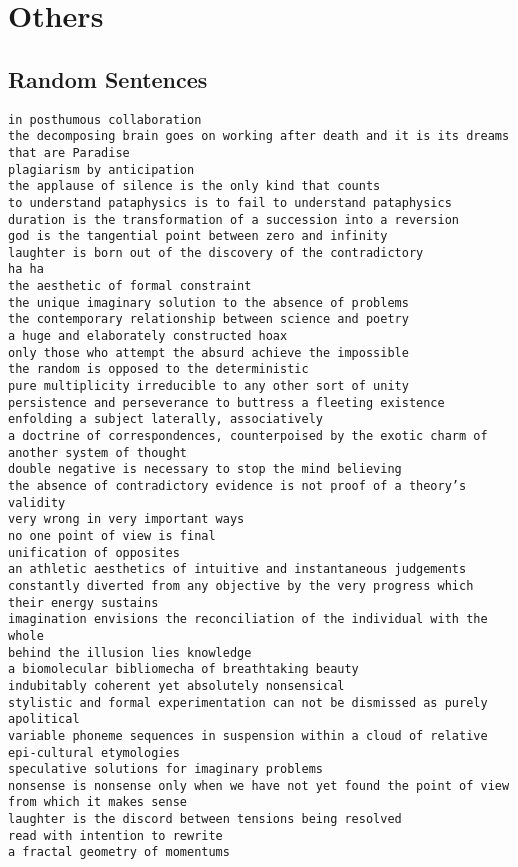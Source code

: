 
\chapter{Others}
\label{app:others}


\section{Random Sentences}
\label{s:appsentences}

\begin{verbatim}
in posthumous collaboration
the decomposing brain goes on working after death and it is its dreams that are Paradise
plagiarism by anticipation
the applause of silence is the only kind that counts
to understand pataphysics is to fail to understand pataphysics
duration is the transformation of a succession into a reversion
god is the tangential point between zero and infinity
laughter is born out of the discovery of the contradictory
ha ha
the aesthetic of formal constraint
the unique imaginary solution to the absence of problems
the contemporary relationship between science and poetry
a huge and elaborately constructed hoax
only those who attempt the absurd achieve the impossible
the random is opposed to the deterministic
pure multiplicity irreducible to any other sort of unity
persistence and perseverance to buttress a fleeting existence
enfolding a subject laterally, associatively
a doctrine of correspondences, counterpoised by the exotic charm of another system of thought
double negative is necessary to stop the mind believing
the absence of contradictory evidence is not proof of a theory’s validity
very wrong in very important ways
no one point of view is final
unification of opposites
an athletic aesthetics of intuitive and instantaneous judgements
constantly diverted from any objective by the very progress which their energy sustains
imagination envisions the reconciliation of the individual with the whole
behind the illusion lies knowledge
a biomolecular bibliomecha of breathtaking beauty
indubitably coherent yet absolutely nonsensical
stylistic and formal experimentation can not be dismissed as purely apolitical
variable phoneme sequences in suspension within a cloud of relative epi-cultural etymologies
speculative solutions for imaginary problems
nonsense is nonsense only when we have not yet found the point of view from which it makes sense
laughter is the discord between tensions being resolved
read with intention to rewrite
a fractal geometry of momentums

\end{verbatim}
